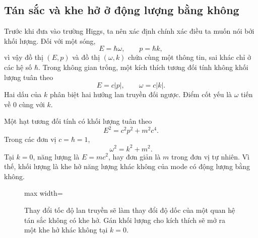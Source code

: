 \subsection{Tán sắc và khe hở ở động lượng bằng không}

Trước khi đưa vào trường Higgs, ta nên xác định chính xác điều ta muốn nói bởi khối lượng. Đối với một sóng,
\begin{equation}
  E=\hbar\omega,
  \qquad
  p=\hbar k,
  \label{eq:l08-quantum-wave}
\end{equation}
vì vậy đồ thị \((E,p)\) và đồ thị \((\omega,k)\) chứa cùng một thông tin, sai khác chỉ ở các hệ số \(\hbar\). Trong không gian trống, một kích thích tương đối tính không khối lượng tuân theo
\begin{equation}
  E=c|p|,
  \qquad
  \omega=c|k|.
  \label{eq:l08-massless-dispersion}
\end{equation}
Hai dấu của \(k\) phân biệt hai hướng lan truyền đối ngược. Điểm cốt yếu là \(\omega\) tiến về 0 cùng với \(k\).

Một hạt tương đối tính có khối lượng tuân theo
\begin{equation}
  E^2=c^2p^2+m^2c^4.
  \label{eq:l08-massive-dispersion}
\end{equation}
Trong các đơn vị \(c=\hbar=1\),
\begin{equation}
  \omega^2=k^2+m^2.
\end{equation}
Tại \(k=0\), năng lượng là \(E=mc^2\), hay đơn giản là \(m\) trong đơn vị tự nhiên. Vì thế, khối lượng là khe hở năng lượng khác không của mode có động lượng bằng không.

\begin{figure}[htbp]
\centering
\begin{adjustbox}{max width=\linewidth}
\end{adjustbox}
\caption{Thay đổi tốc độ lan truyền sẽ làm thay đổi độ dốc của một quan hệ tán sắc không có khe hở. Gán khối lượng cho kích thích sẽ mở ra một khe hở khác không tại \(k=0\).}
\label{fig:l08-dispersion}
\end{figure}

